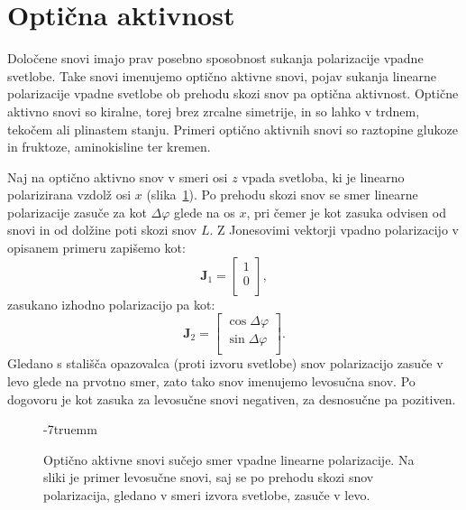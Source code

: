\section{Optična aktivnost}
Določene snovi imajo prav posebno sposobnost sukanja polarizacije vpadne svetlobe.
Take snovi imenujemo optično aktivne snovi, pojav sukanja linearne polarizacije
vpadne svetlobe ob prehodu skozi snov pa optična aktivnost.
Optične aktivno snovi so kiralne, torej brez zrcalne simetrije, in so lahko
v trdnem, tekočem ali plinastem stanju. Primeri optično aktivnih snovi
so raztopine glukoze in fruktoze, aminokisline ter kremen.

Naj na optično aktivno snov v smeri osi $z$
vpada svetloba, ki je linearno polarizirana vzdolž osi $x$ 
(slika~\ref{fig:09_aktivnost}). Po 
prehodu skozi snov se smer linearne polarizacije
zasuče za kot $\Delta \varphi$ glede na os $x$, pri čemer je kot zasuka 
odvisen od snovi in od dolžine poti skozi snov $L$. Z Jonesovimi
vektorji vpadno polarizacijo v opisanem primeru zapišemo kot:
\begin{equation}
\mathbf{J}_{1} = 
\left[\begin{array}{c}
1\\
0\\
\end{array}\right]\!\!,
\label{eq:09_40}
\end{equation}
zasukano izhodno polarizacijo pa kot:
\begin{equation}
\mathbf{J}_{2} = 
\left[\begin{array}{c}
\cos \Delta \varphi\\
\sin \Delta \varphi\\
\end{array}\right]\!\!.
\label{eq:09_41}
\end{equation}
Gledano s stališča opazovalca (proti izvoru svetlobe)
snov polarizacijo zasuče v levo glede na prvotno smer, zato tako snov imenujemo
levosučna snov. Po dogovoru je kot zasuka za levosučne snovi negativen, za
desnosučne pa pozitiven.
\begin{figure}[ht]
\centering
\def\svgwidth{100truemm} 

\caption{Optično aktivne snovi sučejo smer vpadne linearne polarizacije. Na sliki
je primer levosučne snovi, saj se po prehodu skozi snov polarizacija, gledano v smeri 
izvora svetlobe, zasuče v levo.}
\label{fig:09_aktivnost}
\vglue-7truemm
\end{figure}
 
